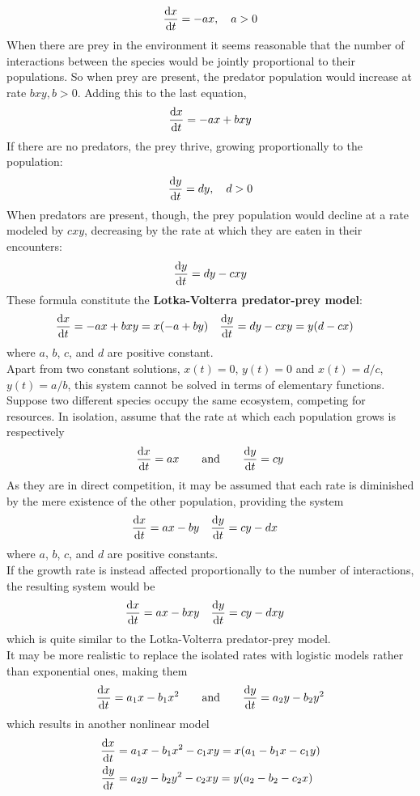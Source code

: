 \documentclass[./Differential Equations.tex]{subfiles}
\begin{document}
				\[\dv{x}{t} = -ax, \quad a > 0\]
				When there are prey in the environment it seems reasonable that the number of interactions between the species would be jointly proportional to their populations. So when prey are present, the predator population would increase at rate \(bxy, b > 0\). Adding this to the last equation,
				\[\dv{x}{t} = -ax + bxy\]
			If there are no predators, the prey thrive, growing proportionally to the population:
				\[\dv{y}{t} = dy, \quad d > 0\]
				When predators are present, though, the prey population would decline at a rate modeled by \(cxy\), decreasing by the rate at which they are eaten in their encounters:
				\[\dv{y}{t} = dy - cxy\]
				These formula constitute the \textbf{Lotka-Volterra predator-prey model}:
				\begin{align*}
					\dv{x}{t} &= -ax + bxy = x(-a + by) & 
						\dv{y}{t} &= dy - cxy = y(d - cx)
				\end{align*}
				where \(a\), \(b\), \(c\), and \(d\) are positive constant. \\
				Apart from two constant solutions, \(x(t) = 0\), \(y(t) = 0\) and \(x(t) = d/c\), \(y(t) = a/b\), this system cannot be solved in terms of elementary functions.
			Suppose two different species occupy the same ecosystem, competing for resources. In isolation, assume that the rate at which each population grows is respectively
				\[\dv{x}{t} = ax \qquad \text{and} \qquad \dv{y}{t} = cy\]
				As they are in direct competition, it may be assumed that each rate is diminished by the mere existence of the other population, providing the system
				\begin{align*}
					\dv{x}{t} &= ax - by &
						\dv{y}{t} &= cy - dx
				\end{align*}
				where \(a\), \(b\), \(c\), and \(d\) are positive constants. \\
				If the growth rate is instead affected proportionally to the number of interactions, the resulting system would be
				\begin{align*}
					\dv{x}{t} &= ax - bxy &
						\dv{y}{t} &= cy - dxy
				\end{align*}
				which is quite similar to the Lotka-Volterra predator-prey model. \\
				It may be more realistic to replace the isolated rates with logistic models rather than exponential ones, making them
				\[\dv{x}{t} = a_1x - b_1x^2 \qquad \text{and} \qquad \dv{y}{t} = a_2y - b_2y^2\]
				which results in another nonlinear model
				\begin{align*}
					\dv{x}{t} &= a_1x - b_1x^2 - c_1xy = x(a_1 - b_1x - c_1y) \\
					\dv{y}{t} &= a_2y - b_2y^2 - c_2xy = y(a_2 - b_2 - c_2x)
				\end{align*}
\end{document}
